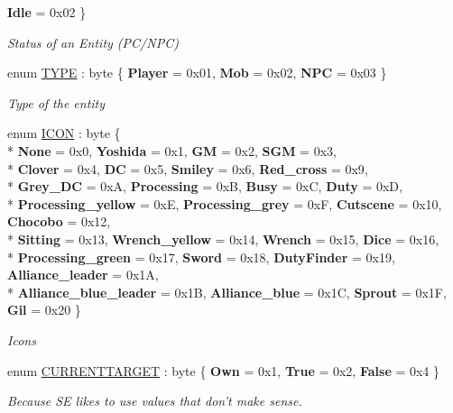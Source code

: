 \begin{DoxyCompactItemize}
{\bfseries Idle} = 0x02
 \}
\begin{DoxyCompactList}\small\item\em Status of an Entity (P\-C/\-N\-P\-C) \end{DoxyCompactList}\item 
enum \hyperlink{namespaceffxivlib_aaa4e86d1ea6dbc1661147e6616256e68}{T\-Y\-P\-E} \-: byte \{ {\bfseries Player} = 0x01, 
{\bfseries Mob} = 0x02, 
{\bfseries N\-P\-C} = 0x03
 \}
\begin{DoxyCompactList}\small\item\em Type of the entity \end{DoxyCompactList}\item 
enum \hyperlink{namespaceffxivlib_a3a6b3a65a3fc9ba42586b2ccc07e4aac}{I\-C\-O\-N} \-: byte \{ \\*
{\bfseries None} = 0x0, 
{\bfseries Yoshida} = 0x1, 
{\bfseries G\-M} = 0x2, 
{\bfseries S\-G\-M} = 0x3, 
\\*
{\bfseries Clover} = 0x4, 
{\bfseries D\-C} = 0x5, 
{\bfseries Smiley} = 0x6, 
{\bfseries Red\-\_\-cross} = 0x9, 
\\*
{\bfseries Grey\-\_\-\-D\-C} = 0x\-A, 
{\bfseries Processing} = 0x\-B, 
{\bfseries Busy} = 0x\-C, 
{\bfseries Duty} = 0x\-D, 
\\*
{\bfseries Processing\-\_\-yellow} = 0x\-E, 
{\bfseries Processing\-\_\-grey} = 0x\-F, 
{\bfseries Cutscene} = 0x10, 
{\bfseries Chocobo} = 0x12, 
\\*
{\bfseries Sitting} = 0x13, 
{\bfseries Wrench\-\_\-yellow} = 0x14, 
{\bfseries Wrench} = 0x15, 
{\bfseries Dice} = 0x16, 
\\*
{\bfseries Processing\-\_\-green} = 0x17, 
{\bfseries Sword} = 0x18, 
{\bfseries Duty\-Finder} = 0x19, 
{\bfseries Alliance\-\_\-leader} = 0x1\-A, 
\\*
{\bfseries Alliance\-\_\-blue\-\_\-leader} = 0x1\-B, 
{\bfseries Alliance\-\_\-blue} = 0x1\-C, 
{\bfseries Sprout} = 0x1\-F, 
{\bfseries Gil} = 0x20
 \}
\begin{DoxyCompactList}\small\item\em Icons \end{DoxyCompactList}\item 
enum \hyperlink{namespaceffxivlib_a027fd426531e3a42243f5c2b946dde31}{C\-U\-R\-R\-E\-N\-T\-T\-A\-R\-G\-E\-T} \-: byte \{ {\bfseries Own} = 0x1, 
{\bfseries True} = 0x2, 
{\bfseries False} = 0x4
 \}
\begin{DoxyCompactList}\small\item\em Because S\-E likes to use values that don't make sense. \end{DoxyCompactList}\end{DoxyCompactItemize}


